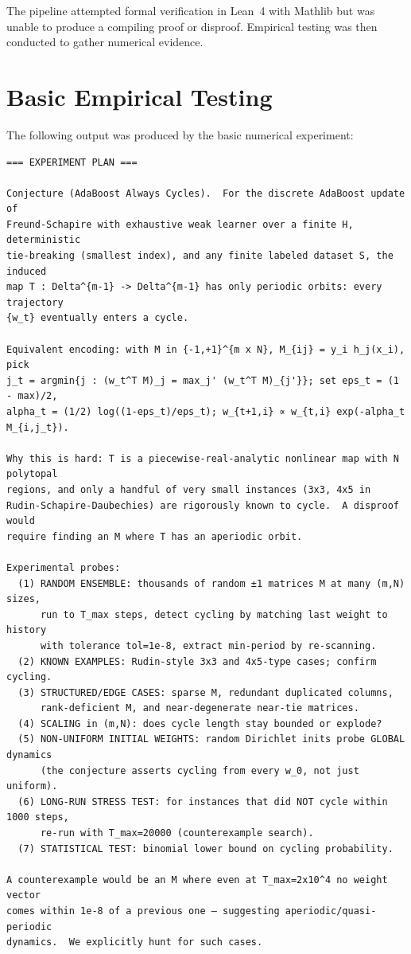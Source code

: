 \documentclass[11pt]{article}
\begin{document}
The pipeline attempted formal verification in Lean~4 with Mathlib but was unable to
produce a compiling proof or disproof. Empirical testing was then conducted to gather
numerical evidence.

\section{Basic Empirical Testing}

The following output was produced by the basic numerical experiment:

\begin{lstlisting}
=== EXPERIMENT PLAN ===

Conjecture (AdaBoost Always Cycles).  For the discrete AdaBoost update of
Freund-Schapire with exhaustive weak learner over a finite H, deterministic
tie-breaking (smallest index), and any finite labeled dataset S, the induced
map T : Delta^{m-1} -> Delta^{m-1} has only periodic orbits: every trajectory
{w_t} eventually enters a cycle.

Equivalent encoding: with M in {-1,+1}^{m x N}, M_{ij} = y_i h_j(x_i), pick
j_t = argmin{j : (w_t^T M)_j = max_j' (w_t^T M)_{j'}}; set eps_t = (1 - max)/2,
alpha_t = (1/2) log((1-eps_t)/eps_t); w_{t+1,i} ∝ w_{t,i} exp(-alpha_t M_{i,j_t}).

Why this is hard: T is a piecewise-real-analytic nonlinear map with N polytopal
regions, and only a handful of very small instances (3x3, 4x5 in
Rudin-Schapire-Daubechies) are rigorously known to cycle.  A disproof would
require finding an M where T has an aperiodic orbit.

Experimental probes:
  (1) RANDOM ENSEMBLE: thousands of random ±1 matrices M at many (m,N) sizes,
      run to T_max steps, detect cycling by matching last weight to history
      with tolerance tol=1e-8, extract min-period by re-scanning.
  (2) KNOWN EXAMPLES: Rudin-style 3x3 and 4x5-type cases; confirm cycling.
  (3) STRUCTURED/EDGE CASES: sparse M, redundant duplicated columns,
      rank-deficient M, and near-degenerate near-tie matrices.
  (4) SCALING in (m,N): does cycle length stay bounded or explode?
  (5) NON-UNIFORM INITIAL WEIGHTS: random Dirichlet inits probe GLOBAL dynamics
      (the conjecture asserts cycling from every w_0, not just uniform).
  (6) LONG-RUN STRESS TEST: for instances that did NOT cycle within 1000 steps,
      re-run with T_max=20000 (counterexample search).
  (7) STATISTICAL TEST: binomial lower bound on cycling probability.

A counterexample would be an M where even at T_max=2x10^4 no weight vector
comes within 1e-8 of a previous one — suggesting aperiodic/quasi-periodic
dynamics.  We explicitly hunt for such cases.



\end{lstlisting}
\end{document}
